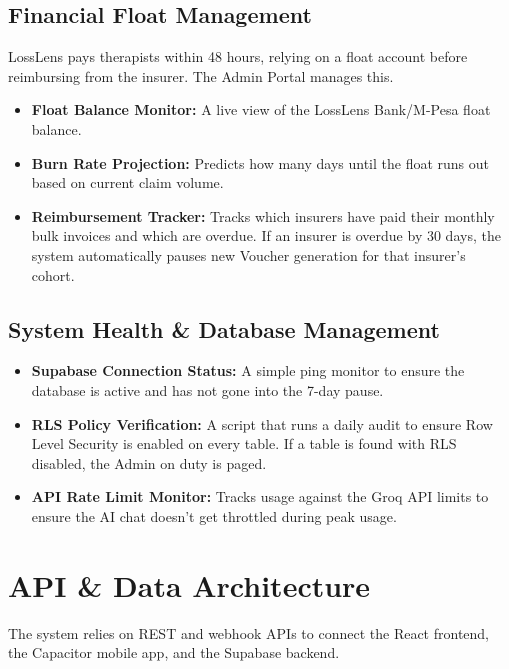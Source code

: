 \documentclass[11pt,a4paper]{article}
\begin{document}
\subsection{Financial Float Management}
LossLens pays therapists within 48 hours, relying on a float account before reimbursing from the insurer. The Admin Portal manages this.
\begin{itemize}
    \item \textbf{Float Balance Monitor:} A live view of the LossLens Bank/M-Pesa float balance.
    \item \textbf{Burn Rate Projection:} Predicts how many days until the float runs out based on current claim volume.
    \item \textbf{Reimbursement Tracker:} Tracks which insurers have paid their monthly bulk invoices and which are overdue. If an insurer is overdue by 30 days, the system automatically pauses new Voucher generation for that insurer's cohort.
\end{itemize}

\subsection{System Health \& Database Management}
\begin{itemize}
    \item \textbf{Supabase Connection Status:} A simple ping monitor to ensure the database is active and has not gone into the 7-day pause.
    \item \textbf{RLS Policy Verification:} A script that runs a daily audit to ensure Row Level Security is enabled on every table. If a table is found with RLS disabled, the Admin on duty is paged.
    \item \textbf{API Rate Limit Monitor:} Tracks usage against the Groq API limits to ensure the AI chat doesn't get throttled during peak usage.
\end{itemize}

\section{API \& Data Architecture}
The system relies on REST and webhook APIs to connect the React frontend, the Capacitor mobile app, and the Supabase backend.
\end{document}
